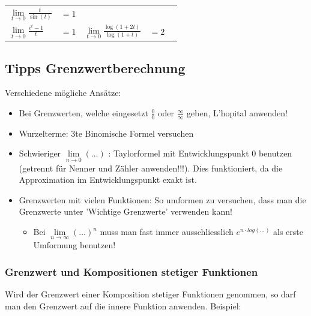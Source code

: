 \documentclass[a4paper, fontsize = 8pt, landscape]{scrartcl}
\begin{document}
\begin{multicols*}{3}
\begin{center}
\begin{tabular}{l l l l l}
            $\lim\limits_{t \to 0} \frac{t}{\sin(t)}$                         & \hspace*{-10pt}$= 1$                         \\
            $\lim\limits_{t \to 0} \frac{e^t - 1}{t}$                         & \hspace*{-10pt}$= 1$       & \hspace*{+10pt}
            $\lim\limits_{t \to 0} \frac{\log(1 + 2t)}{\log(1 + t)}$          & \hspace*{-10pt}$= 2$                         \\
            \bottomrule
        \end{tabular}
    \end{center}


    \subsection{Tipps Grenzwertberechnung}

    Verschiedene mögliche Ansätze:

    \begin{itemize}
        \item Bei Grenzwerten, welche eingesetzt $\frac{0}{0}$ oder $\frac{\infty}{\infty}$ geben, L'hopital anwenden!
        \item Wurzelterme: 3te Binomische Formel versuchen
        \item Schwieriger $\lim\limits_{n \to 0} (\dots)$ : Taylorformel mit Entwicklungspunkt $0$ benutzen (getrennt für Nenner und Zähler anwenden!!!). Dies funktioniert, da die Approximation im Entwicklungspunkt exakt ist.
        \item Grenzwerten mit vielen Funktionen: So umformen zu versuchen, dass man die Grenzwerte unter 'Wichtige Grenzwerte' verwenden kann!
              \begin{itemize}
                  \item Bei $\lim\limits_{n \to \infty} (\dots)^n$ muss man fast immer ausschliesslich $e^{n \cdot log(\dots)}$ als erste Umformung benutzen!
              \end{itemize}
    \end{itemize}

    \subsubsection{Grenzwert und Kompositionen stetiger Funktionen}

    Wird der Grenzwert einer Komposition stetiger Funktionen genommen, so darf man den Grenzwert auf die innere Funktion anwenden. Beispiel:


\end{multicols*}
\end{document}
